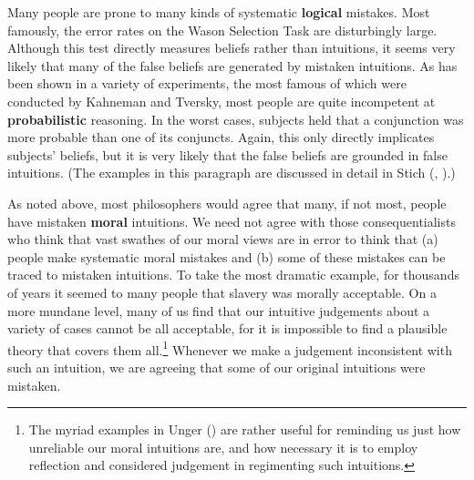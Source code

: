 \documentclass[
  10pt,
  letterpaper,
  DIV=11,
  numbers=noendperiod,
  twoside]{scrartcl}
\begin{document}
Many people are prone to many kinds of systematic \textbf{logical}
mistakes. Most famously, the error rates on the Wason Selection Task are
disturbingly large. Although this test directly measures beliefs rather
than intuitions, it seems very likely that many of the false beliefs are
generated by mistaken intuitions. As has been shown in a variety of
experiments, the most famous of which were conducted by Kahneman and
Tversky, most people are quite incompetent at \textbf{probabilistic}
reasoning. In the worst cases, subjects held that a conjunction was more
probable than one of its conjuncts. Again, this only directly implicates
subjects' beliefs, but it is very likely that the false beliefs are
grounded in false intuitions. (The examples in this paragraph are
discussed in detail in Stich (,
).)

As noted above, most philosophers would agree that many, if not most,
people have mistaken \textbf{moral} intuitions. We need not agree with
those consequentialists who think that vast swathes of our moral views
are in error to think that (a) people make systematic moral mistakes and
(b) some of these mistakes can be traced to mistaken intuitions. To take
the most dramatic example, for thousands of years it seemed to many
people that slavery was morally acceptable. On a more mundane level,
many of us find that our intuitive judgements about a variety of cases
cannot be all acceptable, for it is impossible to find a plausible
theory that covers them all.\footnote{The myriad examples in Unger
  () are rather useful for reminding us
  just how unreliable our moral intuitions are, and how necessary it is
  to employ reflection and considered judgement in regimenting such
  intuitions.} Whenever we make a judgement inconsistent with such an
intuition, we are agreeing that some of our original intuitions were
mistaken.
\end{document}
